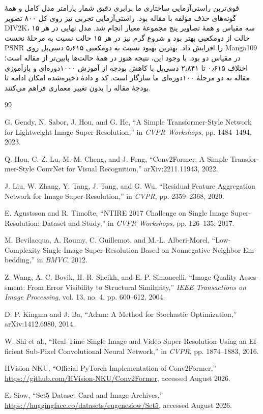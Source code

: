 قوی‌ترین راستی‌آزمایی ساختاری ما برابری دقیق شمار پارامتر مدل کامل و همهٔ گونه‌های حذف مؤلفه با مقاله بود. راستی‌آزمایی تجربی نیز روی کل ۸۰۰ تصویر DIV2K، سه مقیاس و همهٔ تصاویر پنج مجموعهٔ معیار انجام شد. مدل نهایی در هر ۱۵ حالت از دو‌مکعبی بهتر بود و شروع گرم نیز در هر ۱۵ حالت نسبت به مرحلهٔ نخست PSNR را افزایش داد. بهترین بهبود نسبت به دو‌مکعبی ۵٫۶۱۵ دسی‌بل روی Manga109 در مقیاس دو بود. با وجود این، نتیجه هنوز در همهٔ حالت‌ها پایین‌تر از مقاله است؛ اختلاف ۰٫۶۱۵ تا ۲٫۸۴۱ دسی‌بل با کاهش بودجه از آموزش ۱۰۰۰‌دوره‌ای و بازآموزی مقاله به دو مرحلهٔ ۱۰۰‌دوره‌ای ما سازگار است. کد و دادهٔ ذخیره‌شده امکان ادامه تا بودجهٔ مقاله را بدون تغییر معماری فراهم می‌کنند.

\renewcommand{\bibname}{منابع}
\begin{thebibliography}{99}
\begin{latin}
G. Gendy, N. Sabor, J. Hou, and G. He, ``A Simple Transformer-Style Network for Lightweight Image Super-Resolution,'' in \textit{CVPR Workshops}, pp. 1484--1494, 2023.

Q. Hou, C.-Z. Lu, M.-M. Cheng, and J. Feng, ``Conv2Former: A Simple Transformer-Style ConvNet for Visual Recognition,'' arXiv:2211.11943, 2022.

J. Liu, W. Zhang, Y. Tang, J. Tang, and G. Wu, ``Residual Feature Aggregation Network for Image Super-Resolution,'' in \textit{CVPR}, pp. 2359--2368, 2020.

E. Agustsson and R. Timofte, ``NTIRE 2017 Challenge on Single Image Super-Resolution: Dataset and Study,'' in \textit{CVPR Workshops}, pp. 126--135, 2017.

M. Bevilacqua, A. Roumy, C. Guillemot, and M.-L. Alberi-Morel, ``Low-Complexity Single-Image Super-Resolution Based on Nonnegative Neighbor Embedding,'' in \textit{BMVC}, 2012.

Z. Wang, A. C. Bovik, H. R. Sheikh, and E. P. Simoncelli, ``Image Quality Assessment: From Error Visibility to Structural Similarity,'' \textit{IEEE Transactions on Image Processing}, vol. 13, no. 4, pp. 600--612, 2004.

D. P. Kingma and J. Ba, ``Adam: A Method for Stochastic Optimization,'' arXiv:1412.6980, 2014.

W. Shi et al., ``Real-Time Single Image and Video Super-Resolution Using an Efficient Sub-Pixel Convolutional Neural Network,'' in \textit{CVPR}, pp. 1874--1883, 2016.

HVision-NKU, ``Official PyTorch Implementation of Conv2Former,'' \url{https://github.com/HVision-NKU/Conv2Former}, accessed August 2026.

E. Siow, ``Set5 Dataset Card and Image Archives,'' \url{https://huggingface.co/datasets/eugenesiow/Set5}, accessed August 2026.
\end{latin}
\end{thebibliography}
